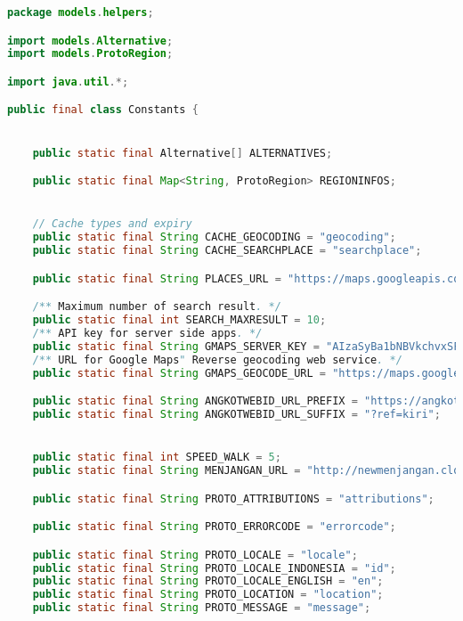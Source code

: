 \begin{lstlisting}[language=Java,basicstyle=\tiny,caption=Constants.java]
package models.helpers;

import models.Alternative;
import models.ProtoRegion;

import java.util.*;

public final class Constants {


    public static final Alternative[] ALTERNATIVES;

    public static final Map<String, ProtoRegion> REGIONINFOS;


    // Cache types and expiry
    public static final String CACHE_GEOCODING = "geocoding";
    public static final String CACHE_SEARCHPLACE = "searchplace";

    public static final String PLACES_URL = "https://maps.googleapis.com/maps/api/place/nearbysearch/json";

    /** Maximum number of search result. */
    public static final int SEARCH_MAXRESULT = 10;
    /** API key for server side apps. */
    public static final String GMAPS_SERVER_KEY = "AIzaSyBa1bNBVkchvxSFd8U_Cn7HsHux6M-DIk4";
    /** URL for Google Maps" Reverse geocoding web service. */
    public static final String GMAPS_GEOCODE_URL = "https://maps.googleapis.com/maps/api/geocode/json";

    public static final String ANGKOTWEBID_URL_PREFIX = "https://angkot.web.id/go/route/";
    public static final String ANGKOTWEBID_URL_SUFFIX = "?ref=kiri";


    public static final int SPEED_WALK = 5;
    public static final String MENJANGAN_URL = "http://newmenjangan.cloudapp.net:8000";

    public static final String PROTO_ATTRIBUTIONS = "attributions";

    public static final String PROTO_ERRORCODE = "errorcode";

    public static final String PROTO_LOCALE = "locale";
    public static final String PROTO_LOCALE_INDONESIA = "id";
    public static final String PROTO_LOCALE_ENGLISH = "en";
    public static final String PROTO_LOCATION = "location";
    public static final String PROTO_MESSAGE = "message";


\end{lstlisting}
